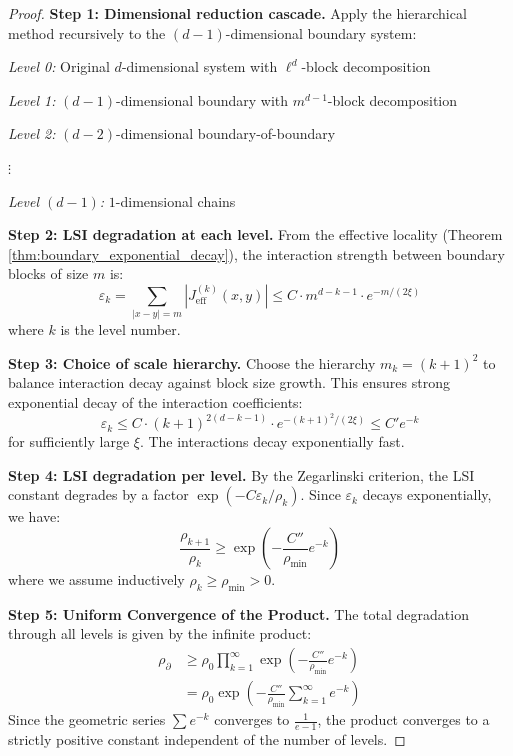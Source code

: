 \begin{proof}
\textbf{Step 1: Dimensional reduction cascade.}
Apply the hierarchical method recursively to the $(d-1)$-dimensional boundary system:

\textit{Level 0:} Original $d$-dimensional system with $\ell^d$-block decomposition

\textit{Level 1:} $(d-1)$-dimensional boundary with $m^{d-1}$-block decomposition  

\textit{Level 2:} $(d-2)$-dimensional boundary-of-boundary

$\vdots$

\textit{Level $(d-1)$:} $1$-dimensional chains

\textbf{Step 2: LSI degradation at each level.}
From the effective locality (Theorem \ref{thm:boundary_exponential_decay}), the interaction strength between boundary blocks of size $m$ is:
\begin{equation}
\varepsilon_k = \sum_{|x-y|=m} |J_{\text{eff}}^{(k)}(x,y)| \leq C \cdot m^{d-k-1} \cdot e^{-m/(2\xi)}
\end{equation}
where $k$ is the level number.

\textbf{Step 3: Choice of scale hierarchy.}
Choose the hierarchy $m_k = (k+1)^2$ to balance interaction decay against block size growth. This ensures strong exponential decay of the interaction coefficients:
\begin{equation}
\varepsilon_k \leq C \cdot (k+1)^{2(d-k-1)} \cdot e^{-(k+1)^2/(2\xi)} \leq C' e^{-k}
\end{equation}
for sufficiently large $\xi$. The interactions decay exponentially fast.

\textbf{Step 4: LSI degradation per level.}
By the Zegarlinski criterion, the LSI constant degrades by a factor $\exp(-C\varepsilon_k/\rho_k)$. Since $\varepsilon_k$ decays exponentially, we have:
\begin{equation}
\frac{\rho_{k+1}}{\rho_k} \geq \exp\left(-\frac{C''}{\rho_{\min}} e^{-k}\right)
\end{equation}
where we assume inductively $\rho_k \geq \rho_{\min} > 0$.

\textbf{Step 5: Uniform Convergence of the Product.}
The total degradation through all levels is given by the infinite product:
\begin{align}
\rho_{\partial} &\geq \rho_{0} \prod_{k=1}^{\infty} \exp\left(-\frac{C''}{\rho_{\min}} e^{-k}\right) \\
&= \rho_{0} \exp\left(-\frac{C''}{\rho_{\min}} \sum_{k=1}^{\infty} e^{-k}\right)
\end{align}
Since the geometric series $\sum e^{-k}$ converges to $\frac{1}{e-1}$, the product converges to a strictly positive constant independent of the number of levels.


\end{proof}
